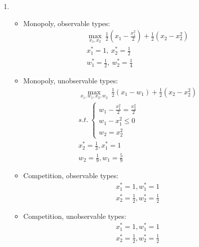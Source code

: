 \documentclass[a4paper]{article}
\begin{document}
\begin{enumerate}
	\item \begin{itemize}
		\item Monopoly, observable types:
		\begin{align*}
		\underset{x_1, x_2}{\max}\ \frac{1}{2}\left(x_1 -\frac{x_1^2}{2}\right) + \frac{1}{2} \left(x_2 - x_2^2\right)\\
		x_1^* = 1,\ x_2^* = \frac{1}{2}\\
		w_1^* = \frac{1}{2},\ w_2^* = \frac{1}{4}
		\end{align*}
		\item Monopoly, unobservable types:
		\begin{align*}
		\underset{x_1, w_1, x_2, w_2}{\max}\ \frac{1}{2}\left(x_1 -w_1\right) + \frac{1}{2} \left(x_2 - x_2^2\right)\\
		s.t.\ 	\begin{cases}
		w_1 - \frac{x_1^2}{2} = \frac{x_2^2}{2}\\
		w_1 - x_1^2 \le 0\\
		w_2 = x_2^2
		\end{cases}\\
		x_2^* = \frac{1}{3}, x_1^* = 1\\
		w_2 = \frac{1}{9}, w_1 = \frac{5}{9}
		\end{align*}
		\item Competition, observable types:
		\begin{align*}
		x_1^* = 1, w_1^* = 1\\
		x_2^* = \frac{1}{2}, w_2^* = \frac{1}{2}
		\end{align*}
		\item Competition, unobservable types:
		\begin{align*}
		x_1^* = 1, w_1^* = 1\\
		x_2^* = \frac{1}{2}, w_2^* = \frac{1}{2}
		\end{align*}
	\end{itemize}
\end{enumerate}
\end{document}
